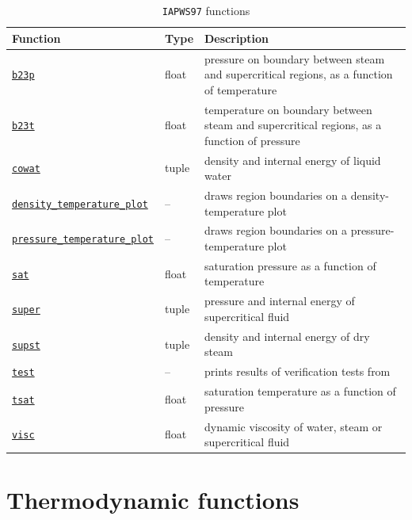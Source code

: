 \begin{table}
  \begin{center}
    \begin{tabular}{|l|l|p{65mm}|}
      \hline
      \textbf{Function} & \textbf{Type} & \textbf{Description}\\
      \hline
      \hyperref[sec:iapws97:b23p]{\texttt{b23p}} & float & pressure on boundary between steam and supercritical regions, as a function of temperature\\
      \hyperref[sec:iapws97:b23t]{\texttt{b23t}} & float & temperature on boundary between steam and supercritical regions, as a function of pressure\\
      \hyperref[sec:iapws97:cowat]{\texttt{cowat}} & tuple & density and internal energy of liquid water\\
      \hyperref[sec:iapws97:density_temperature_plot]{\texttt{density\_temperature\_plot}} & -- & draws region boundaries on a density-temperature plot\\
      \hyperref[sec:iapws97:pressure_temperature_plot]{\texttt{pressure\_temperature\_plot}} & -- & draws region boundaries on a pressure-temperature plot\\
      \hyperref[sec:iapws97:sat]{\texttt{sat}} & float & saturation pressure as a function of temperature\\
      \hyperref[sec:iapws97:super]{\texttt{super}} & tuple & pressure and internal energy of supercritical fluid\\
      \hyperref[sec:iapws97:supst]{\texttt{supst}} & tuple & density and internal energy of dry steam\\
      \hyperref[sec:iapws97:test]{\texttt{test}} & -- & prints results of verification tests from \cite{iapws_2000}\\
      \hyperref[sec:iapws97:tsat]{\texttt{tsat}} & float & saturation temperature as a function of pressure\\
      \hyperref[sec:iapws97:visc]{\texttt{visc}} & float & dynamic viscosity of water, steam or supercritical fluid\\
      \hline
    \end{tabular}
    \caption{\texttt{IAPWS97} functions}
    \label{tb:iapws97_functions}
  \end{center}
\end{table}

\section{Thermodynamic functions}

